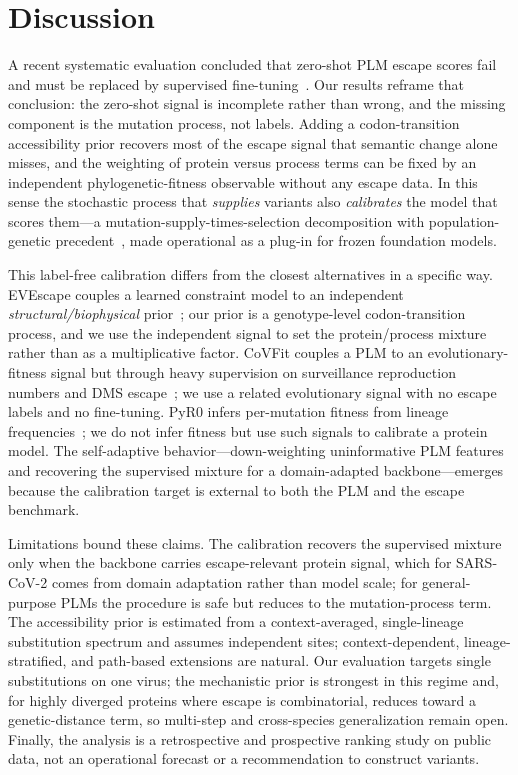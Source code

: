 \documentclass[11pt]{article}
\begin{document}
\section*{Discussion}

A recent systematic evaluation concluded that zero-shot PLM escape scores fail and must be replaced by supervised fine-tuning~\cite{allman2025systematic}. Our results reframe that conclusion: the zero-shot signal is incomplete rather than wrong, and the missing component is the mutation process, not labels. Adding a codon-transition accessibility prior recovers most of the escape signal that semantic change alone misses, and the weighting of protein versus process terms can be fixed by an independent phylogenetic-fitness observable without any escape data. In this sense the stochastic process that \emph{supplies} variants also \emph{calibrates} the model that scores them---a mutation-supply-times-selection decomposition with population-genetic precedent~\cite{Rodrigue2010}, made operational as a plug-in for frozen foundation models.

This label-free calibration differs from the closest alternatives in a specific way. EVEscape couples a learned constraint model to an independent \emph{structural/biophysical} prior~\cite{thadani2023evescape}; our prior is a genotype-level codon-transition process, and we use the independent signal to set the protein/process mixture rather than as a multiplicative factor. CoVFit couples a PLM to an evolutionary-fitness signal but through heavy supervision on surveillance reproduction numbers and DMS escape~\cite{covfit2025}; we use a related evolutionary signal with no escape labels and no fine-tuning. PyR0 infers per-mutation fitness from lineage frequencies~\cite{obermeyer2022analysis}; we do not infer fitness but use such signals to calibrate a protein model. The self-adaptive behavior---down-weighting uninformative PLM features and recovering the supervised mixture for a domain-adapted backbone---emerges because the calibration target is external to both the PLM and the escape benchmark.

Limitations bound these claims. The calibration recovers the supervised mixture only when the backbone carries escape-relevant protein signal, which for SARS-CoV-2 comes from domain adaptation rather than model scale; for general-purpose PLMs the procedure is safe but reduces to the mutation-process term. The accessibility prior is estimated from a context-averaged, single-lineage substitution spectrum and assumes independent sites; context-dependent, lineage-stratified, and path-based extensions are natural. Our evaluation targets single substitutions on one virus; the mechanistic prior is strongest in this regime and, for highly diverged proteins where escape is combinatorial, reduces toward a genetic-distance term, so multi-step and cross-species generalization remain open. Finally, the analysis is a retrospective and prospective ranking study on public data, not an operational forecast or a recommendation to construct variants.
\end{document}
